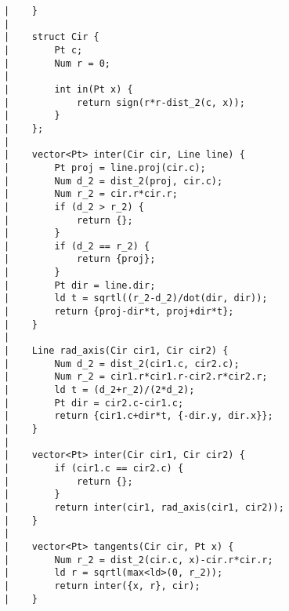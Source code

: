 \documentclass[a4paper, 10pt]{article}
\begin{document}
\begin{center}
\begin{verbatim}
|    }
|    
|    struct Cir {
|        Pt c;
|        Num r = 0;
|    
|        int in(Pt x) {
|            return sign(r*r-dist_2(c, x));
|        }
|    };
|    
|    vector<Pt> inter(Cir cir, Line line) {
|        Pt proj = line.proj(cir.c);
|        Num d_2 = dist_2(proj, cir.c);
|        Num r_2 = cir.r*cir.r;
|        if (d_2 > r_2) {
|            return {};
|        }
|        if (d_2 == r_2) {
|            return {proj};
|        }
|        Pt dir = line.dir;
|        ld t = sqrtl((r_2-d_2)/dot(dir, dir));
|        return {proj-dir*t, proj+dir*t};
|    }
|    
|    Line rad_axis(Cir cir1, Cir cir2) {
|        Num d_2 = dist_2(cir1.c, cir2.c);
|        Num r_2 = cir1.r*cir1.r-cir2.r*cir2.r;
|        ld t = (d_2+r_2)/(2*d_2);
|        Pt dir = cir2.c-cir1.c;
|        return {cir1.c+dir*t, {-dir.y, dir.x}};
|    }
|    
|    vector<Pt> inter(Cir cir1, Cir cir2) {
|        if (cir1.c == cir2.c) {
|            return {};
|        }
|        return inter(cir1, rad_axis(cir1, cir2));
|    }
|    
|    vector<Pt> tangents(Cir cir, Pt x) {
|        Num r_2 = dist_2(cir.c, x)-cir.r*cir.r;
|        ld r = sqrtl(max<ld>(0, r_2));
|        return inter({x, r}, cir);
|    }
\end{verbatim}


\end{center}
\end{document}
